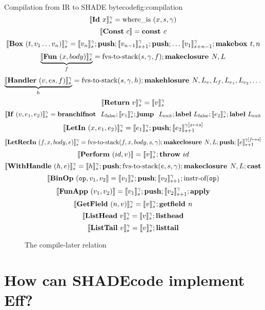 \documentclass[class=article, crop=false]{standalone}
\begin{document}
\begin{myfigure}[1]{Compilation from IR to SHADE bytecode}{fig:compilation}
    $$ \interp{\irId\ x}_s^\gamma = \text{where\_is}\ (x, s, \gamma) $$
    $$ \interp{\irConst\ c} = \textbf{const } c $$
    $$ \llbracket \mathbf{Box}\ (t, v_1 \dots v_n) \rrbracket_s ^ \gamma = \llbracket v_n \rrbracket_s^\gamma; \textbf{push}; \llbracket v_{n-1} \rrbracket_{s+1}^\gamma; \textbf{push}; \dots \llbracket v_1 \rrbracket_{s+n-1}^\gamma; \textbf{makebox }t, n $$
    $$ \underbrace{\llbracket \mathbf{Fun}\ (x, body) \rrbracket_s ^\gamma }_f = \text{fvs-to-stack} (s, \gamma, f); \textbf{makeclosure }N, L $$
    $$ \underbrace{\llbracket \mathbf{Handler}\ (v, es, f) \rrbracket_s^\gamma}_h = \text{fvs-to-stack} (s, \gamma, h); \textbf{makehlosure }N, L_v, L_f, L_{e_1}, L_{e_2}, \dots $$
    $$ \llbracket \mathbf{Return}\ v \rrbracket_s ^ \gamma =  \llbracket v \rrbracket_s ^ \gamma $$
    $$ \llbracket \mathbf{If}\ (v, e_1, e_2) \rrbracket_s ^ \gamma = \textbf{branchifnot }\ L_\text{false}; \llbracket e_1 \rrbracket_s^\gamma; \textbf{jump }\ L_\text{exit}; \textbf{label}\ L_\text{false}; \llbracket e_2 \rrbracket_s^\gamma; \textbf{label}\ L_\text{exit} $$
    $$ \llbracket \mathbf{LetIn}\ (x, e_1, e_2) \rrbracket_s^\gamma = \llbracket e_1 \rrbracket_s^\gamma; \textbf{push}; \llbracket e_2 \rrbracket_{s+1}^{\gamma[x \mapsto s]} $$
    $$ \llbracket \mathbf{LetRecIn}\ (f, x, body, e) \rrbracket_s^\gamma = \text{fvs-to-stack}(f, x, body, s, \gamma); \textbf{makeclosure }N, L; \textbf{push}; \llbracket e \rrbracket_{s+1}^{\gamma[f \mapsto s]} $$
    $$ \llbracket \mathbf{Perform}\ (id, v) \rrbracket = \llbracket v \rrbracket_s ^ \gamma; \textbf{throw}\ id $$
    $$ \llbracket \mathbf{WithHandle}\ (h, e) \rrbracket_s ^ \gamma = \llbracket h \rrbracket_s ^ \gamma; \textbf{push}; \text{fvs-to-stack}(e, s, \gamma); \textbf{makeclosure }N, L; \mathbf{cast} $$
    $$ \llbracket \mathbf{BinOp}\ (\mathtt{op}, v_1, v_2 \rrbracket = \llbracket v_1 \rrbracket_s ^ \gamma; \textbf{push}; \llbracket v_2 \rrbracket_{s+1}^\gamma; \text{instr-of}(\mathtt{op}) $$
    $$ \llbracket \mathbf{FunApp}\ (v_1, v_2) \rrbracket = \llbracket v_1 \rrbracket_s ^ \gamma; \textbf{push}; \llbracket v_2 \rrbracket_{s+1} ^ \gamma; \textbf{apply} $$
    $$ \llbracket \mathbf{GetField}\ (n, v) \rrbracket_s ^ \gamma = \llbracket v \rrbracket_s ^ \gamma; \textbf{getfield }n $$
    $$ \llbracket \mathbf{ListHead}\ v \rrbracket_s ^ \gamma = \llbracket v \rrbracket_s ^ \gamma; \textbf{listhead} $$
    $$ \llbracket \mathbf{ListTail}\ v \rrbracket_s ^ \gamma = \llbracket v \rrbracket_s ^ \gamma ; \textbf{listtail} $$
\end{myfigure}

\begin{figure}


    \caption{The compile-later relation}
    \label{compile-later}
\end{figure}

\section{How can SHADEcode implement Eff?}
\end{document}
